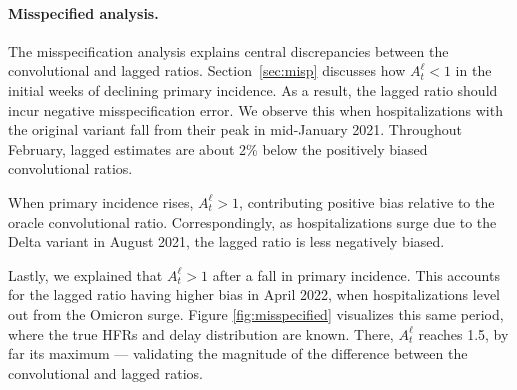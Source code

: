 \documentclass{article}
\begin{document}
\paragraph{Misspecified analysis.}
The misspecification analysis explains central discrepancies between the convolutional and lagged ratios. 
Section~\ref{sec:misp} discusses how $A_t^\ell<1$ in the initial weeks of declining primary incidence. As a result, the lagged ratio should incur negative misspecification error. We observe this when hospitalizations with the original variant fall from their peak in mid-January 2021. Throughout February, lagged estimates are about 2\% below the positively biased convolutional ratios.

When primary incidence rises, $A_t^\ell>1$, contributing positive bias relative to the oracle convolutional ratio. Correspondingly, as hospitalizations surge due to the Delta variant in August 2021, the lagged ratio is less negatively biased. 

Lastly, we explained that $A_t^\ell>1$ after a fall in primary incidence. This accounts for the lagged ratio having higher bias in April 2022, when hospitalizations level out from the Omicron surge. Figure \ref{fig:misspecified} visualizes this same period, where the true HFRs and delay distribution are known. There, $A_t^\ell$ reaches 1.5, by far its maximum --- validating the magnitude of the difference between the convolutional and lagged ratios.




\end{document}
